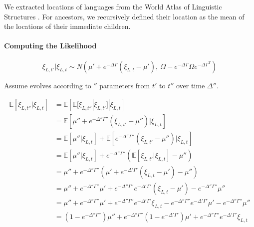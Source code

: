 \documentclass[11pt,a4paper]{article}
\begin{document}
We extracted locations of languages from the World Atlas of Linguistic Structures \citep{haspelmath2005the}.
For ancestors, we recursively defined their location as the mean of the locations of their immediate children.



\paragraph{Computing the Likelihood}


\begin{equation}
\xi_{L,t'} | \xi_{L,t} \sim N\left(\mu' + e^{-\Delta \Gamma} (\xi_{L,t}-\mu'),\ \Omega - e^{-\Delta \Gamma} \Omega e^{-\Delta \Gamma^T}\right)
\end{equation}

Assume evolves according to $''$ parameters from $t'$ to $t''$ over time $\Delta''$.

\begin{align*}
\mathbb{E}[\xi_{L,t''} | \xi_{L,t}] &= \mathbb{E}\left[ \mathbb{E}[\xi_{L,t''} | \xi_{L,t'}] | \xi_{L,t}\right ] \\
&=  \mathbb{E}\left[  \mu'' + e^{-\Delta'' \Gamma''} (\xi_{L,t'}-\mu'')      | \xi_{L,t}\right ] \\
&= \mathbb{E}\left[  \mu'' | \xi_{L,t}\right ]  + \mathbb{E}\left[e^{-\Delta'' \Gamma''} (\xi_{L,t'}-\mu'')      | \xi_{L,t}\right ] \\
&= \mathbb{E}\left[  \mu'' | \xi_{L,t}\right ]  + e^{-\Delta'' \Gamma''} (\mathbb{E}\left[\xi_{L,t'}|\xi_{L,t}\right ]-\mu'')        \\
&= \mu'' + e^{-\Delta'' \Gamma''} ( \mu' + e^{-\Delta' \Gamma'} (\xi_{L,t}-\mu')    -\mu'') \\
&= \mu'' + e^{-\Delta'' \Gamma''} \mu' + e^{-\Delta'' \Gamma''} e^{-\Delta' \Gamma'} (\xi_{L,t}-\mu')    - e^{-\Delta'' \Gamma''} \mu'' \\
&= \mu'' + e^{-\Delta'' \Gamma''} \mu' + e^{-\Delta'' \Gamma''} e^{-\Delta' \Gamma'} \xi_{L,t}- e^{-\Delta'' \Gamma''} e^{-\Delta' \Gamma'}  \mu'    - e^{-\Delta'' \Gamma''} \mu'' \\
&= (1-e^{-\Delta'' \Gamma''}) \mu'' + e^{-\Delta'' \Gamma''} (1-e^{-\Delta' \Gamma'} ) \mu' + e^{-\Delta'' \Gamma''} e^{-\Delta' \Gamma'} \xi_{L,t}
\end{align*}
\end{document}
